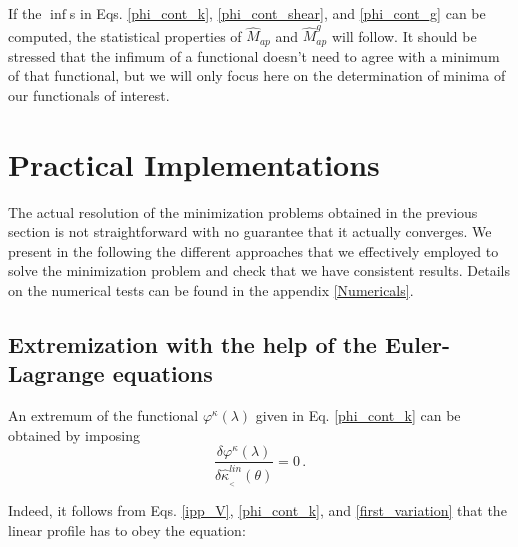 \documentclass[twocolumn,aps,reprint, nofootinbib]{revtex4}
\newcommand{\hkappa}{\hat{\kappa}_{_<}}
\newcommand{\Map}{\hat{M}_{ap}}
\newcommand{\Mapg}{\hat{M}_{ap}^g}
\newcommand{\varphik}{\varphi^{\kappa}}
\newcommand{\fb}[1]{{\textcolor{red}{#1}}}
\begin{document}
If the $\inf$s in Eqs. \eqref{phi_cont_k}, \eqref{phi_cont_shear}, and \eqref{phi_cont_g} can be computed, the statistical properties of $\Map$ and $\Mapg$ will follow. It should be stressed that the infimum of a functional doesn't need to agree with a minimum of that functional, but we will only focus here on the determination of minima of our functionals of interest.



\section{Practical Implementations}

The actual resolution of the minimization problems obtained in the previous section is not straightforward with no guarantee that it actually converges. We present in the following the different approaches that we effectively employed to solve
the minimization problem and check that we have consistent results. Details on the numerical tests can be found in the appendix \ref{Numericals}.

\subsection{Extremization with the help of the Euler-Lagrange equations}
\label{euler_lagrange_sec}
An extremum of the functional $\varphik(\lambda)$ given in Eq. \eqref{phi_cont_k} can be obtained by imposing
\begin{equation}
\label{first_variation}
\frac{\delta \varphik(\lambda)}{\delta \hkappa^{lin}(\theta)} = 0 \, .
\end{equation}

Indeed, it follows from Eqs. \eqref{ipp_V}, \eqref{phi_cont_k}, and \eqref{first_variation} that the linear profile has to obey the equation:
\end{document}
